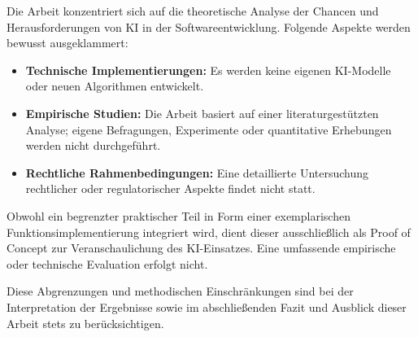 
Die Arbeit konzentriert sich auf die theoretische Analyse der Chancen und
Herausforderungen von KI in der Softwareentwicklung. Folgende Aspekte werden
bewusst ausgeklammert:

\begin{itemize}
    \item \textbf{Technische Implementierungen:} Es werden keine eigenen KI-Modelle oder neuen Algorithmen entwickelt.
    \item \textbf{Empirische Studien:} Die Arbeit basiert auf einer literaturgestützten Analyse; eigene Befragungen, Experimente oder quantitative Erhebungen werden nicht durchgeführt.
    \item \textbf{Rechtliche Rahmenbedingungen:} Eine detaillierte Untersuchung rechtlicher oder regulatorischer Aspekte findet nicht statt.
\end{itemize}

Obwohl ein begrenzter praktischer Teil in Form einer exemplarischen
Funktionsimplementierung integriert wird, dient dieser ausschließlich als Proof
of Concept zur Veranschaulichung des KI-Einsatzes. Eine umfassende empirische
oder technische Evaluation erfolgt nicht.

Diese Abgrenzungen und methodischen Einschränkungen sind bei der Interpretation
der Ergebnisse sowie im abschließenden Fazit und Ausblick dieser Arbeit stets
zu berücksichtigen.
